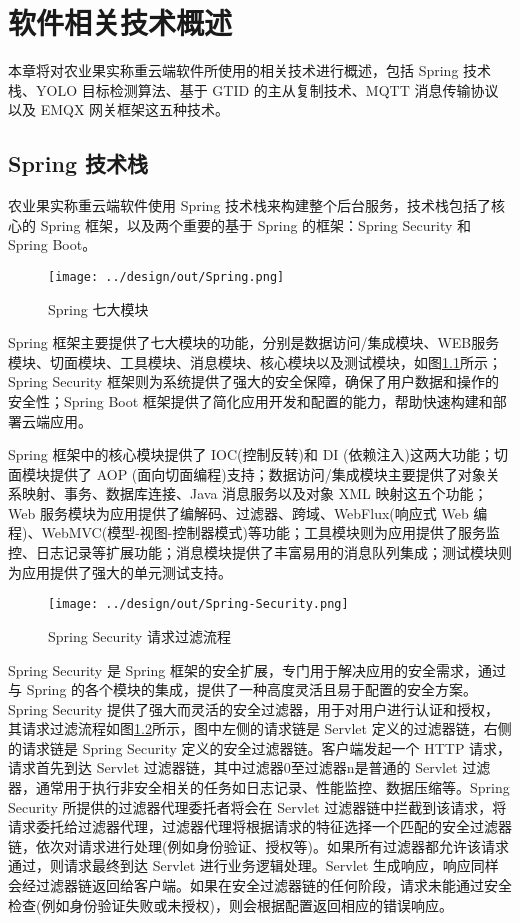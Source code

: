 \chapter{软件相关技术概述}

本章将对农业果实称重云端软件所使用的相关技术进行概述，包括 Spring 技术栈、YOLO 目标检测算法、基于 GTID 的主从复制技术、MQTT 消息传输协议以及 EMQX 网关框架这五种技术。

\section{Spring 技术栈}\label{sec:spring}

农业果实称重云端软件使用 Spring 技术栈来构建整个后台服务，技术栈包括了核心的 Spring 框架，以及两个重要的基于 Spring 的框架：Spring Security 和 Spring Boot。

\begin{figure}[H]
    \centering
    \texttt{[image: ../design/out/Spring.png]}
    \caption{Spring 七大模块}
    \label{fig:Spring}
\end{figure}

Spring 框架主要提供了七大模块的功能，分别是数据访问/集成模块、WEB服务模块、切面模块、工具模块、消息模块、核心模块以及测试模块，如图\ref{fig:Spring}所示；Spring Security 框架则为系统提供了强大的安全保障，确保了用户数据和操作的安全性；Spring Boot 框架提供了简化应用开发和配置的能力，帮助快速构建和部署云端应用。

Spring 框架中的核心模块提供了 IOC(控制反转)和 DI (依赖注入)这两大功能；切面模块提供了 AOP (面向切面编程)支持；数据访问/集成模块主要提供了对象关系映射、事务、数据库连接、Java 消息服务以及对象 XML 映射这五个功能；Web 服务模块为应用提供了编解码、过滤器、跨域、WebFlux(响应式 Web 编程)、WebMVC(模型-视图-控制器模式)等功能；工具模块则为应用提供了服务监控、日志记录等扩展功能；消息模块提供了丰富易用的消息队列集成；测试模块则为应用提供了强大的单元测试支持\cite{Spring-框架概述}。

\begin{figure}[H]
    \centering
    \texttt{[image: ../design/out/Spring-Security.png]}
    \caption{Spring Security 请求过滤流程}
    \label{fig:Spring-Security}
\end{figure}

Spring Security 是 Spring 框架的安全扩展，专门用于解决应用的安全需求，通过与 Spring 的各个模块的集成，提供了一种高度灵活且易于配置的安全方案。Spring Security 提供了强大而灵活的安全过滤器，用于对用户进行认证和授权，其请求过滤流程如图\ref{fig:Spring-Security}所示，图中左侧的请求链是 Servlet 定义的过滤器链，右侧的请求链是 Spring Security 定义的安全过滤器链。客户端发起一个 HTTP 请求，请求首先到达 Servlet 过滤器链，其中过滤器0至过滤器n是普通的 Servlet 过滤器，通常用于执行非安全相关的任务如日志记录、性能监控、数据压缩等。Spring Security 所提供的过滤器代理委托者将会在 Servlet 过滤器链中拦截到该请求，将请求委托给过滤器代理，过滤器代理将根据请求的特征选择一个匹配的安全过滤器链，依次对请求进行处理(例如身份验证、授权等)。如果所有过滤器都允许该请求通过，则请求最终到达 Servlet 进行业务逻辑处理。Servlet 生成响应，响应同样会经过滤器链返回给客户端。如果在安全过滤器链的任何阶段，请求未能通过安全检查(例如身份验证失败或未授权)，则会根据配置返回相应的错误响应\cite{Spring-Security-架构设计}。

